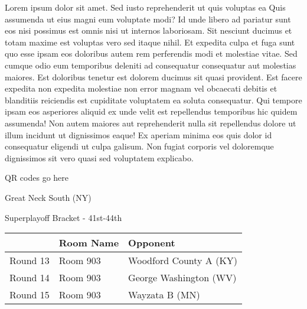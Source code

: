 \documentclass{article}%
\begin{document}
\vspace*{8pt}%
\linebreak%
\newline%
\newline%
Lorem ipsum dolor sit amet. Sed iusto reprehenderit ut quis voluptas ea Quis assumenda ut eius magni eum voluptate modi? Id unde libero ad pariatur sunt eos nisi possimus est omnis nisi ut internos laboriosam. Sit nesciunt ducimus et totam maxime est voluptas vero sed itaque nihil. Et expedita culpa et fuga sunt quo esse ipsam eos doloribus autem rem perferendis modi et molestiae vitae.\newline%
\newline%
Sed cumque odio eum temporibus deleniti ad consequatur consequatur aut molestias maiores. Est doloribus tenetur est dolorem ducimus sit quasi provident. Est facere expedita non expedita molestiae non error magnam vel obcaecati debitis et blanditiis reiciendis est cupiditate voluptatem ea soluta consequatur. Qui tempore ipsam eos asperiores aliquid ex unde velit est repellendus temporibus hic quidem assumenda!\newline%
\newline%
Non autem maiores aut reprehenderit nulla sit repellendus dolore ut illum incidunt ut dignissimos eaque! Ex aperiam minima eos quis dolor id consequatur eligendi ut culpa galisum. Non fugiat corporis vel doloremque dignissimos sit vero quasi sed voluptatem explicabo.\newline%
\newline%
%
\vspace*{30pt}%
\begin{center}%
\begin{Huge}%
QR codes go here%
\end{Huge}%
\end{center}%
\newpage%
\begin{center}%
\begin{Huge}%
Great Neck South (NY)%
\end{Huge}%
\vspace*{8pt}%
\linebreak%
\begin{Large}%
Superplayoff Bracket {-} 41st{-}44th%
\end{Large}%
\end{center}%
%
\begin{tabularx}{\textwidth}{|c|Y|Y|}%
\hline%
&Room Name&Opponent\\%
\hline%
Round 13&Room 903&Woodford County A (KY)\\%
Round 14&Room 903&George Washington (WV)\\%
Round 15&Room 903&Wayzata B (MN)\\%
\hline%
\end{tabularx}%
\end{document}
